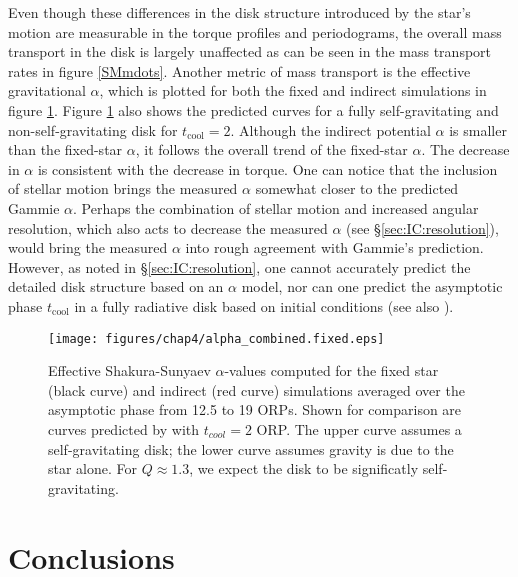 Even though these differences in the disk structure introduced by the star's motion are measurable in the torque profiles and periodograms, the overall mass transport in the disk is largely unaffected as can be seen in the mass transport rates in figure \ref{SMmdots}. Another metric of mass transport is the effective gravitational $\alpha$, which is plotted for both the fixed and indirect simulations in figure \ref{SMalphas}. Figure \ref{SMalphas} also shows the predicted \citet{gammie2001} curves for a fully self-gravitating and non-self-gravitating disk for $t_{\mathrm{cool}} = 2$. Although the indirect potential $\alpha$ is smaller than the fixed-star $\alpha$, it follows the overall trend of the fixed-star $\alpha$. The decrease in $\alpha$ is consistent with the decrease in torque. One can notice that the inclusion of stellar motion brings the measured $\alpha$ somewhat closer to the predicted Gammie $\alpha$. Perhaps the combination of stellar motion and increased angular resolution, which also acts to decrease the measured $\alpha$ (see \S\ref{sec:IC:resolution}), would bring the measured $\alpha$ into rough agreement with Gammie's prediction. However, as noted in \S\ref{sec:IC:resolution}, one cannot accurately predict the detailed disk structure based on an $\alpha$ model, nor can one predict the asymptotic phase $t_{\mathrm{cool}}$ in a fully radiative disk based on initial conditions (see also \citet{johnson2003}). 
\begin{figure}[p]
\centering
\texttt{[image: figures/chap4/alpha\_combined.fixed.eps]}
\caption[Comparison of Indirect and Standard run $\alpha$ profiles]{Effective Shakura-Sunyaev $\alpha$-values computed for the fixed star (black curve) and indirect (red curve) simulations averaged over the asymptotic phase from 12.5 to 19 ORPs. Shown for comparison are curves predicted by \citeauthor{gammie2001} with $t_{cool} = 2$ ORP. The upper curve assumes a self-gravitating disk; the lower curve assumes gravity is due to the star alone. For $Q \approx 1.3$, we expect the disk to be significatly self-gravitating.}
\label{SMalphas}
\end{figure}

\section{Conclusions} \label{SMconclusions}

